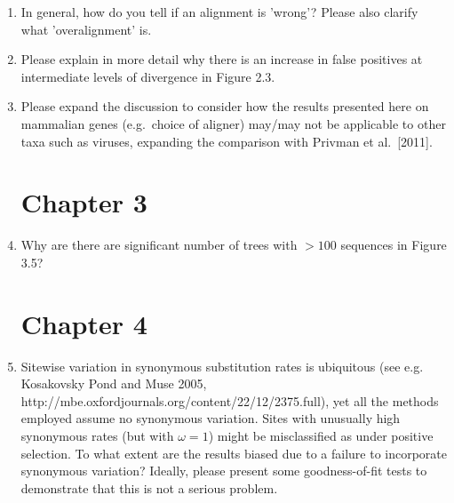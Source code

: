 \begin{enumerate}
{
}

\item{ In general, how do you tell if an alignment is 'wrong'? Please also
clarify what 'overalignment' is.

}

\item{ Please explain in more detail why there is an increase in false
positives at intermediate levels of divergence in Figure 2.3.

}

\item{ Please expand the discussion to consider how the results presented
here on mammalian genes (e.g.\ choice of aligner) may/may not be
applicable to other taxa such as viruses, expanding the comparison
with Privman et al.\ [2011].

}

\section{Chapter 3}

\item{ Why are there are significant number of trees with $>100$ sequences in
Figure 3.5?}

\section{Chapter 4}

\item{ Sitewise variation in
  synonymous substitution rates is ubiquitous (see e.g. Kosakovsky
  Pond and Muse 2005,
  http://mbe.oxfordjournals.org/content/22/12/2375.full), yet all the
  methods employed assume no synonymous variation. Sites with
  unusually high synonymous rates (but with $\omega=1$) might be
  misclassified as under positive selection. To what extent are the
  results biased due to a failure to incorporate synonymous variation?
  Ideally, please present some goodness-of-fit tests to demonstrate
  that this is not a serious problem.}


\end{enumerate}
